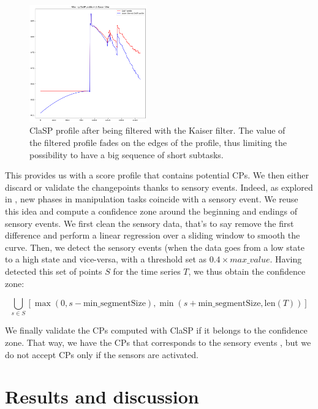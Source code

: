 \documentclass[conference]{IEEEtran}
\begin{document}
\begin{figure}[ht]
  \centering
  \includegraphics[width=0.45\textwidth, height=2.5
in]{img/resolKaiser.png}
  \caption{ClaSP profile after being filtered with the Kaiser filter. The value of the filtered profile fades on the edges of the profile, thus limiting the possibility to have a big sequence of short subtasks.}
  \label{fig:Kaiser}
\end{figure}

This provides us with a score profile that contains potential CPs. We then either discard or validate the changepoints thanks to sensory events. Indeed, as explored in \cite{sensory_seg}, new phases in manipulation tasks coincide  with a sensory event. We reuse this idea and compute a confidence zone around the beginning and endings of sensory events. We first clean the sensory data, that's to say remove the first difference and perform a linear regression over a sliding window to smooth the curve. Then,  we detect the sensory events  (when the data goes from a low state to a high  state and vice-versa, with a threshold set as $0.4\times max\_value$. Having detected this set of points $S$ for the time series $T$, we thus obtain the confidence zone:

\begin{equation}
        \bigcup_{s \in S} \left[ \max(0, s - \text{min\_segmentSize}),\min(s + \text{min\_segmentSize}, \text{len}(T)) \right]
\end{equation}

We finally validate the CPs computed with ClaSP if it belongs to the confidence zone. That way, we have the CPs that corresponds to the sensory events , but we do not accept CPs only if the sensors are activated.

\section{Results and discussion} \label{results}
\end{document}
